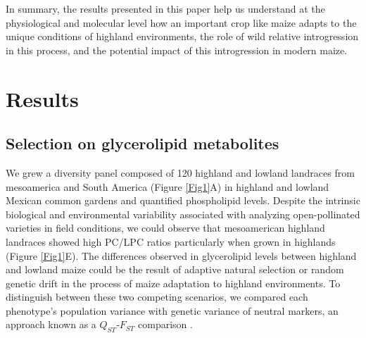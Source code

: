 \documentclass[9pt,twocolumn,twoside,lineno]{BioRxiv}
\begin{document}
In summary, the results presented in this paper help us understand at the physiological and molecular level how an important crop like maize adapts to the unique conditions of highland environments, the role of wild relative introgression in this process, and the potential impact of this introgression in modern maize.

\section{Results}
\label{sec:results}
\subsection{Selection on glycerolipid metabolites}  
We grew a diversity panel composed of 120 highland and lowland landraces from mesoamerica and South America (Figure \ref{Fig1}A) in highland and lowland Mexican common gardens and quantified phospholipid levels.    
Despite the intrinsic biological and environmental variability associated with analyzing open-pollinated varieties in field conditions, we could observe that mesoamerican highland landraces showed  high PC/LPC ratios  particularly when grown in highlands (Figure \ref{Fig1}E). 
The differences observed in glycerolipid levels between highland and lowland maize could be the result of adaptive natural selection or random genetic drift in the process of maize adaptation to highland environments.
To distinguish between these two competing scenarios, we compared each phenotype's population variance with genetic variance of neutral markers, an approach known as a $Q_{ST}$-$F_{ST}$ comparison \cite{Leinonen2013-ic}.
\end{document}
